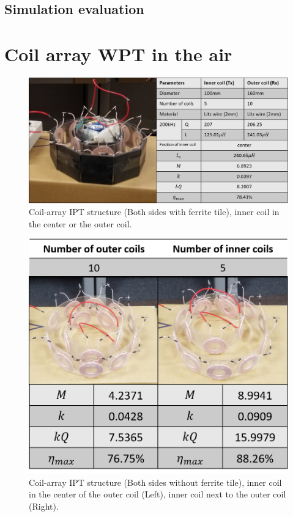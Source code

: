 
\subsection{Simulation evaluation}


\section{Coil array WPT in the air}
\begin{figure}[!t]
    \centering
    \includegraphics[width=1.0\linewidth]{images/4_coil_5_10_with_ferrite.png}
    \caption{Coil-array IPT structure (Both sides with ferrite tile), inner coil in the center or the outer coil.}
\end{figure}
\begin{figure}[!t]
    \centering
    \includegraphics[width=0.6\linewidth]{images/4_coil_5_10_without_ferrite.png}
    \caption{Coil-array IPT structure (Both sides without ferrite tile), inner coil in the center of the outer coil (Left), inner coil next to the outer coil (Right).}
\end{figure}
